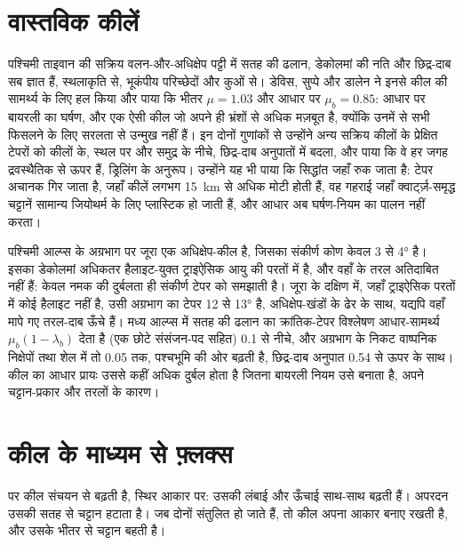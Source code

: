 \section{वास्तविक कीलें}\label{sec:b3:orogenic-wedges:real}

पश्चिमी ताइवान की सक्रिय वलन-और-अधिक्षेप पट्टी में सतह की ढलान, डेकोलमां की
नति और छिद्र-दाब सब ज्ञात हैं, स्थलाकृति से,
भूकंपीय परिच्छेदों और कुओं से। डेविस, सुप्पे और डालेन ने इनसे कील की सामर्थ्य के लिए
 हल किया और पाया कि भीतर $\mu = 1.03$
और आधार पर $\mu_b = 0.85$: आधार पर बायरली का घर्षण, और एक ऐसी
कील जो अपने ही भ्रंशों से अधिक मज़बूत है, क्योंकि उनमें से सभी फिसलने के लिए
सरलता से उन्मुख नहीं हैं। इन दोनों गुणांकों से उन्होंने अन्य सक्रिय कीलों के प्रेक्षित टेपरों को
कीलों के, स्थल पर और समुद्र के नीचे, छिद्र-दाब अनुपातों में बदला, और पाया
कि वे हर जगह द्रवस्थैतिक से ऊपर हैं, ड्रिलिंग के अनुरूप। उन्होंने यह भी पाया
कि सिद्धांत जहाँ रुक जाता है: टेपर अचानक गिर जाता है, जहाँ कीलें
लगभग \qty{15}{km} से अधिक मोटी होती हैं, वह गहराई जहाँ क्वार्ट्ज़-समृद्ध चट्टानें सामान्य जियोथर्म के लिए प्लास्टिक हो जाती हैं,
और आधार अब घर्षण-नियम का पालन नहीं करता।

पश्चिमी आल्प्स के अग्रभाग पर जूरा एक अधिक्षेप-कील है, जिसका संकीर्ण
कोण केवल 3 से \ang{4} है। इसका डेकोलमां अधिकतर हैलाइट-युक्त
ट्राइऐसिक आयु की परतों में है, और वहाँ के तरल अतिदाबित नहीं हैं:
केवल नमक की दुर्बलता ही संकीर्ण टेपर को समझाती है। जूरा के दक्षिण में, जहाँ
ट्राइऐसिक परतों में कोई हैलाइट नहीं है, उसी अग्रभाग का टेपर 12 से
\ang{13} है, अधिक्षेप-खंडों के ढेर के साथ, यद्यपि वहाँ मापे गए तरल-दाब
ऊँचे हैं। मध्य आल्प्स में सतह की ढलान का क्रांतिक-टेपर विश्लेषण
आधार-सामर्थ्य $\mu_b(1 - \lambda_b)$ देता है (एक छोटे
संसंजन-पद सहित) 0.1 से नीचे, और अग्रभाग के निकट वाष्पनिक निक्षेपों तथा शेल में तो 0.05 तक,
पश्चभूमि की ओर बढ़ती है, छिद्र-दाब अनुपात 0.54 से ऊपर के साथ। कील का
आधार प्रायः उससे कहीं अधिक दुर्बल होता है जितना बायरली नियम उसे बनाता है,
अपने चट्टान-प्रकार और तरलों के कारण।

\section{कील के माध्यम से फ़्लक्स}\label{sec:b3:orogenic-wedges:flux}

 पर कील संचयन से बढ़ती है, स्थिर आकार पर: उसकी लंबाई
और ऊँचाई साथ-साथ बढ़ती हैं। अपरदन उसकी सतह से चट्टान हटाता है। जब दोनों
संतुलित हो जाते हैं, तो कील अपना आकार बनाए रखती है, और उसके भीतर से चट्टान बहती है।

